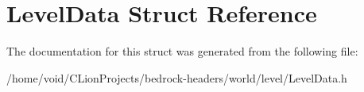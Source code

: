 \hypertarget{struct_level_data}{}\section{Level\+Data Struct Reference}
\label{struct_level_data}


The documentation for this struct was generated from the following file\+:\begin{DoxyCompactItemize}
\item 
/home/void/\+C\+Lion\+Projects/bedrock-\/headers/world/level/Level\+Data.\+h\end{DoxyCompactItemize}
